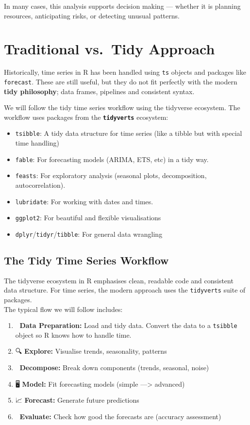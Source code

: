 \documentclass[
  letterpaper,
  DIV=11,
  numbers=noendperiod]{scrreprt}
\providecommand{\tightlist}{%
  \setlength{\itemsep}{0pt}\setlength{\parskip}{0pt}}\usepackage{longtable,booktabs,array}
\begin{document}
In many cases, this analysis supports decision making --- whether it is
planning resources, anticipating risks, or detecting unusual patterns.

\section{Traditional vs.~Tidy
Approach}\label{traditional-vs.-tidy-approach}

Historically, time series in R has been handled using \texttt{ts}
objects and packages like \texttt{forecast}. These are still useful, but
they do not fit perfectly with the modern \textbf{tidy philosophy}; data
frames, pipelines and consistent syntax.

We will follow the tidy time series workflow using the tidyverse
ecosystem. The workflow uses packages from the
\textbf{\texttt{tidyverts}} ecosystem:

\begin{itemize}
\tightlist
\item
  \texttt{tsibble}: A tidy data structure for time series (like a tibble
  but with special time handling)
\item
  \texttt{fable}: For forecasting models (ARIMA, ETS, etc) in a tidy
  way.
\item
  \texttt{feasts}: For exploratory analysis (seasonal plots,
  decomposition, autocorrelation).
\item
  \texttt{lubridate}: For working with dates and times.
\item
  \texttt{ggplot2}: For beautiful and flexible visualisations
\item
  \texttt{dplyr}/\texttt{tidyr}/\texttt{tibble}: For general data
  wrangling
\end{itemize}

\subsection{The Tidy Time Series
Workflow}\label{the-tidy-time-series-workflow}

The tidyverse ecosystem in R emphasises clean, readable code and
consistent data structure. For time series, the modern approach uses the
\texttt{tidyverts} suite of packages.\\
The typical flow we will follow includes:

\begin{enumerate}
\def\labelenumi{\arabic{enumi}.}
\tightlist
\item
  🔧 \textbf{Data Preparation:} Load and tidy data. Convert the data to
  a \texttt{tsibble} object so R knows how to handle time.
\item
  🔍 \textbf{Explore:} Visualise trends, seasonality, patterns
\item
  🧩 \textbf{Decompose:} Break down components (trends, seasonal, noise)
\item
  🖥️ \textbf{Model:} Fit forecasting models (simple ---\textgreater{}
  advanced)
\item
  📈 \textbf{Forecast:} Generate future predictions
\item
  📏 \textbf{Evaluate:} Check how good the forecasts are (accuracy
  assessment)
\end{enumerate}
\end{document}
